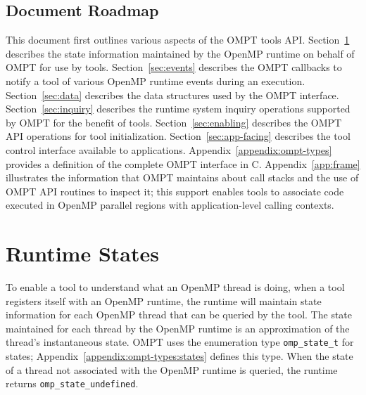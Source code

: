 \documentclass{article}
\begin{document}
\subsection{Document Roadmap}
This document first outlines various aspects of the OMPT tools API. 
Section~\ref{sec:states} describes the state information maintained by the OpenMP runtime on behalf of OMPT for use by tools.
Section~\ref{sec:events} describes the OMPT callbacks to notify a tool of various OpenMP runtime events during an execution.
Section~\ref{sec:data} describes the data structures used by the OMPT interface.
Section~\ref{sec:inquiry} describes the runtime system inquiry operations supported by OMPT for the benefit of tools.
Section~\ref{sec:enabling} describes the OMPT API operations for tool initialization.
Section~\ref{sec:app-facing} describes the tool control interface available to applications.
Appendix~\ref{appendix:ompt-types} provides a definition of the complete OMPT interface in C.
Appendix~\ref{app:frame} illustrates the information that OMPT maintains about call stacks and the use of OMPT API routines to inspect it; this support enables tools to associate code executed in OpenMP parallel regions with  application-level calling contexts. 

\section{Runtime States} 
\label{sec:states} 

To enable a tool to understand what an OpenMP thread is doing, when a tool registers itself with an OpenMP runtime, the runtime 
will maintain state information for each OpenMP thread that can be queried by the tool. 
The state maintained for each thread by the OpenMP runtime is an
approximation of the thread's instantaneous state. 
OMPT uses the enumeration type \verb|omp_state_t| for states;
Appendix~\ref{appendix:ompt-types:states} defines this type.
When the state of a thread not associated with the OpenMP runtime is queried, the runtime returns 
\verb|omp_state_undefined|.

\end{document}
